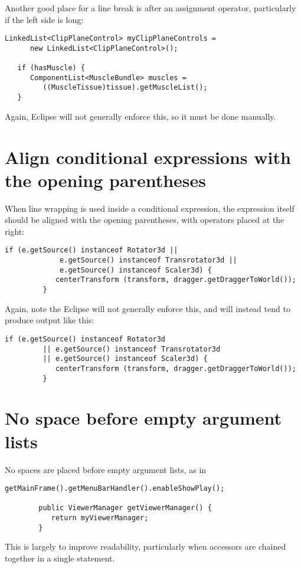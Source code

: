 \documentclass{article}
\begin{document}
Another good place for a line break is after an assignment
operator, particularly if the left side is long:
\begin{lstlisting}[]
   LinkedList<ClipPlaneControl> myClipPlaneControls =
      new LinkedList<ClipPlaneControl>();

   if (hasMuscle) {
      ComponentList<MuscleBundle> muscles =
         ((MuscleTissue)tissue).getMuscleList();
   }
\end{lstlisting}

Again, Eclipse will not generally enforce this, so it must be done
manually.

\section{Align conditional expressions with the opening parentheses}

When line wrapping is used inside a conditional expression,
the expression itself should be aligned with the opening
parentheses, with operators placed at the right:
\begin{lstlisting}[]
         if (e.getSource() instanceof Rotator3d ||
             e.getSource() instanceof Transrotator3d ||
             e.getSource() instanceof Scaler3d) {
            centerTransform (transform, dragger.getDraggerToWorld());
         }
\end{lstlisting}
Again, note the Eclipse will not generally enforce this, and will
instead
tend to produce output like this:
\begin{lstlisting}[]
         if (e.getSource() instanceof Rotator3d
         || e.getSource() instanceof Transrotator3d
         || e.getSource() instanceof Scaler3d) {
            centerTransform (transform, dragger.getDraggerToWorld());
         }
\end{lstlisting}

\section{No space before empty argument lists}

No spaces are placed before empty argument lists, as in

\begin{lstlisting}[]
        getMainFrame().getMenuBarHandler().enableShowPlay();

        public ViewerManager getViewerManager() {
           return myViewerManager;
        }
\end{lstlisting}
This is largely to improve readability, particularly when
accessors are chained together in a single statement.
\end{document}
